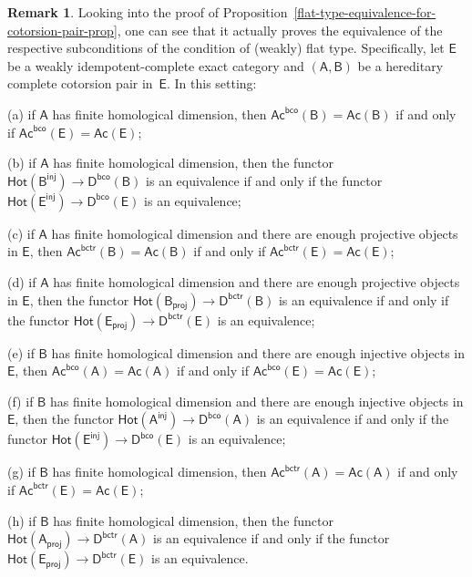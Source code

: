 \documentclass[12pt,a4paper]{amsart}
\newcommand{\+}{\nobreakdash-}
\renewcommand{\:}{\colon}
\newcommand{\rarrow}{\longrightarrow}
\newcommand{\sA}{\mathsf A}
\newcommand{\sB}{\mathsf B}
\newcommand{\sD}{\mathsf D}
\newcommand{\sE}{\mathsf E}
\newcommand{\Hot}{\mathsf{Hot}}
\newcommand{\Ac}{\mathsf{Ac}}
\newcommand{\proj}{\mathsf{proj}}
\newcommand{\inj}{\mathsf{inj}}
\newcommand{\bco}{\mathsf{bco}}
\newcommand{\bctr}{\mathsf{bctr}}
\theoremstyle{plain}
\theoremstyle{definition}
\newtheorem{rem}[thm]{Remark}
\begin{document}
\begin{rem} \label{flat-type-equivalence-for-cotorsion-pair-remark}
 Looking into the proof of
Proposition~\ref{flat-type-equivalence-for-cotorsion-pair-prop}, one
can see that it actually proves the equivalence of the respective
subconditions of the condition of (weakly) flat type.
 Specifically, let $\sE$ be a weakly idempotent-complete exact category
and $(\sA,\sB)$ be a hereditary complete cotorsion pair in~$\sE$.
 In this setting: \par
\textup{(a)} if $\sA$ has finite homological dimension, then
$\Ac^\bco(\sB)=\Ac(\sB)$ if and only if $\Ac^\bco(\sE)=\Ac(\sE)$; \par
\textup{(b)} if $\sA$ has finite homological dimension, then the functor
$\Hot(\sB^\inj)\rarrow\sD^\bco(\sB)$ is an equivalence if and only if
the functor $\Hot(\sE^\inj)\rarrow\sD^\bco(\sE)$ is an equivalence; \par
\textup{(c)} if $\sA$ has finite homological dimension and there are
enough projective objects in $\sE$, then $\Ac^\bctr(\sB)=\Ac(\sB)$
if and only if $\Ac^\bctr(\sE)=\Ac(\sE)$; \par
\textup{(d)} if $\sA$ has finite homological dimension and there are
enough projective objects in $\sE$, then the functor $\Hot(\sB_\proj)
\rarrow\sD^\bctr(\sB)$ is an equivalence if and only if the functor
$\Hot(\sE_\proj)\rarrow\sD^\bctr(\sE)$ is an equivalence;  \par
\textup{(e)} if $\sB$ has finite homological dimension and there are
enough injective objects in $\sE$, then $\Ac^\bco(\sA)=\Ac(\sA)$
if and only if $\Ac^\bco(\sE)=\Ac(\sE)$; \par
\textup{(f)} if $\sB$ has finite homological dimension and there are
enough injective objects in $\sE$, then the functor $\Hot(\sA^\inj)
\rarrow\sD^\bco(\sA)$ is an equivalence if and only if the functor
$\Hot(\sE^\inj)\rarrow\sD^\bco(\sE)$ is an equivalence; \par
\textup{(g)} if $\sB$ has finite homological dimension, then
$\Ac^\bctr(\sA)=\Ac(\sA)$ if and only if $\Ac^\bctr(\sE)=\Ac(\sE)$; \par
\textup{(h)} if $\sB$ has finite homological dimension, then the functor
$\Hot(\sA_\proj)\rarrow\sD^\bctr(\sA)$ is an equivalence if and only if
the functor $\Hot(\sE_\proj)\rarrow\sD^\bctr(\sE)$ is an equivalence.
\end{rem}
\end{document}
